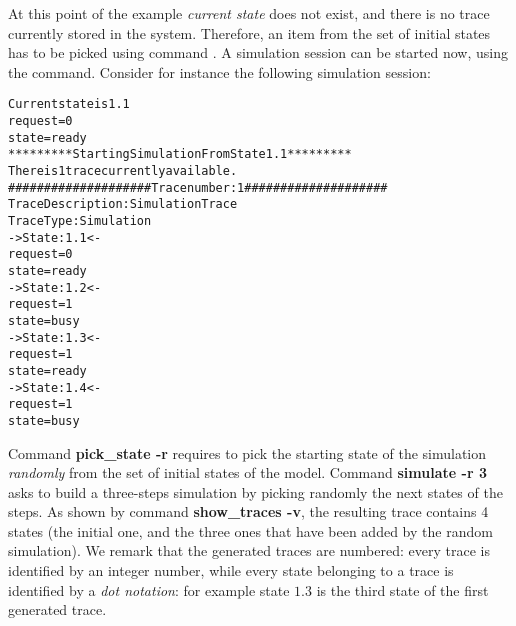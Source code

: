 At this point of the example \emph{current state} does not exist, and there
is no trace currently stored in the system. Therefore,
an item from the set of initial states
has to be picked using command .
A simulation session can be started now, using the 
command.
Consider for instance the following simulation session:
\begin{alltt}
\shellprompt {}
\nusmvprompt {}
\nusmvprompt {}
\nusmvprompt {}
Current state is 1.1
request = 0
state = ready
\nusmvprompt {}
*********  Starting Simulation From State  1.1  *********
\nusmvprompt {}
There is 1 trace currently available.
\nusmvprompt {}
#################### Trace number: 1 ####################
Trace Description: Simulation Trace
Trace Type: Simulation
-> State: 1.1 <-
    request = 0
    state = ready
-> State: 1.2 <-
    request = 1
    state = busy
-> State: 1.3 <-
    request = 1
    state = ready
-> State: 1.4 <-
    request = 1
    state = busy
\end{alltt}

Command {\bf pick\_state -r} requires to pick the starting state of the
simulation \emph{randomly} from the set of initial states of the model.
Command {\bf simulate -r 3} asks to build a three-steps simulation by 
picking randomly the next states of the steps.
As shown by command {\bf show\_traces -v}, 
the resulting trace contains 4 states (the initial one, and the three ones
that have been added by the random simulation).
We remark that the generated traces are numbered: every trace is
identified by an integer number, while every state belonging to a trace
is identified by a \emph{dot notation}: for example state $1.3$ is the
third state of the first generated trace.

